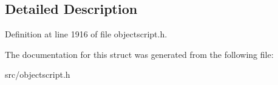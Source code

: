 \subsection{Detailed Description}


Definition at line 1916 of file objectscript.\+h.



The documentation for this struct was generated from the following file\+:\begin{DoxyCompactItemize}
\item 
src/objectscript.\+h\end{DoxyCompactItemize}
